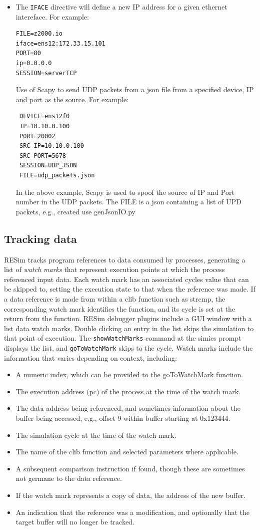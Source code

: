 \documentclass[titlepage]{article}
\begin{document}
\begin{itemize}
\item The {\tt IFACE} directive will define a new IP address for a given ethernet intereface.  For example:
\begin{verbatim}
FILE=z2000.io
iface=ens12:172.33.15.101
PORT=80
ip=0.0.0.0
SESSION=serverTCP
\end{verbatim}

Use of Scapy to send UDP packets from a json file from a specified device, IP and port as the source.  For example:
\begin{verbatim}
 DEVICE=ens12f0
 IP=10.10.0.100
 PORT=20002
 SRC_IP=10.10.0.100
 SRC_PORT=5678
 SESSION=UDP_JSON
 FILE=udp_packets.json 
\end{verbatim}
In the above example, Scapy is used to spoof the source of IP and Port number in the UDP packets.  The FILE is a json containing a list of UPD packets,
e.g., created use genJsonIO.py

\end{itemize}


\subsection{Tracking data}
\label{tracking}
RESim tracks program references to data consumed by processes, generating a list of \textit{watch marks} that represent
execution points at which the process referenced input data.  Each watch mark has an associated cycles value that can be skipped to, setting the
execution state to that when the reference was made.  If a data reference is made from within a clib function such as strcmp, the corresponding 
watch mark identifies the function, and its cycle is set at the return from the function.  RESim debugger plugins include a GUI window with a list data watch marks.
Double clicking an entry in the list skips the simulation to that point of execution.  The {\tt showWatchMarks} command at the simics prompt displays the list,
and {\tt goToWatchMark} skips to the cycle.  Watch marks include the information that varies depending on context, including:
\begin{itemize}
\item A numeric index, which can be provided to the goToWatchMark function.
\item The execution address (pc) of the process at the time of the watch mark.
\item The data address being referenced, and sometimes information about the buffer being accessed, e.g., offset 9 within buffer starting at 0x123444.
\item The simulation cycle at the time of the watch mark.
\item The name of the clib function and selected parameters where applicable.
\item A subsequent comparison instruction if found, though these are sometimes not germane to the data reference.
\item If the watch mark represents a copy of data, the address of the new buffer.
\item An indication that the reference was a modification, and optionally that the target buffer will no longer be tracked.
\end{itemize}
\end{document}
